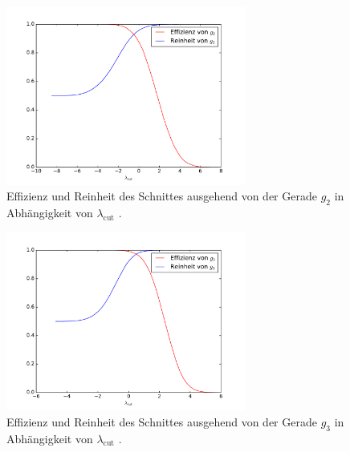 \begin{figure}
  \centering
  \includegraphics[width=0.7\textwidth]{g_2Effizienz.pdf}
  \caption{Effizienz und Reinheit des Schnittes ausgehend von der Gerade $g_2$ in Abhängigkeit von $\lambda_\text{cut}$ .}
  \label{fig:cut2}
\end{figure}



\begin{figure}
  \centering
  \includegraphics[width=0.7\textwidth]{g_3Effizienz.pdf}
  \caption{Effizienz und Reinheit des Schnittes ausgehend von der Gerade $g_3$ in Abhängigkeit von $\lambda_\text{cut}$ .}
  \label{fig:cut3}
\end{figure}
